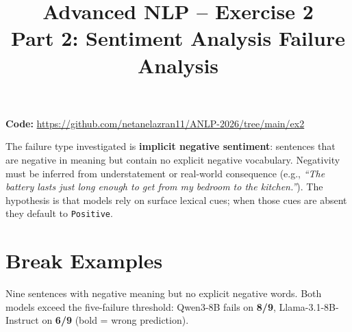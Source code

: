 \documentclass[11pt,a4paper]{article}
\title{\textbf{Advanced NLP -- Exercise 2}\\[0.3em]
       \large Part 2: Sentiment Analysis Failure Analysis}
\author{}
\date{}
\begin{document}
\maketitle

\noindent\textbf{Code:} \url{https://github.com/netanelazran11/ANLP-2026/tree/main/ex2}

\medskip
The failure type investigated is \textbf{implicit negative sentiment}: sentences
that are negative in meaning but contain no explicit negative vocabulary.
Negativity must be inferred from understatement or real-world consequence
(e.g., \emph{``The battery lasts just long enough to get from my bedroom to the kitchen.''}).
The hypothesis is that models rely on surface lexical cues; when those cues are
absent they default to \texttt{Positive}.

\section*{Break Examples}

Nine sentences with negative meaning but no explicit negative words.
Both models exceed the five-failure threshold: Qwen3-8B fails on \textbf{8/9},
Llama-3.1-8B-Instruct on \textbf{6/9} (bold = wrong prediction).
\end{document}
